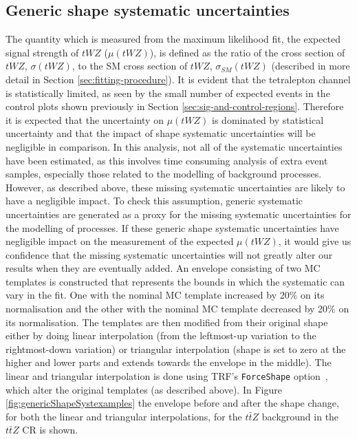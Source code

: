 \subsection{Generic shape systematic uncertainties}
\label{sec:genericShapeSyst}

The quantity which is measured from the maximum likelihood fit, the expected signal strength of $tWZ$ ($\mu (tWZ)$), is defined as the ratio of the cross section of $tWZ$, $\sigma(tWZ)$, to the SM cross section of $tWZ$, $\sigma_{SM}(tWZ)$ (described in more detail in Section \ref{sec:fitting-procedure}). It is evident that the tetralepton channel is statistically limited, as seen by the small number of expected events in the control plots shown previously in Section \ref{sec:sig-and-control-regions}. Therefore it is expected that the uncertainty on $\mu(tWZ)$ is dominated by statistical uncertainty and that the impact of shape systematic uncertainties will be negligible in comparison. In this analysis, not all of the systematic uncertainties have been estimated, as this involves time consuming analysis of extra event samples, especially those related to the modelling of background processes. However, as described above, these missing systematic uncertainties are likely to have a negligible impact. To check this assumption, generic systematic uncertainties are generated as a proxy for the missing systematic uncertainties for the modelling of processes. If these generic shape systematic uncertainties have negligible impact on the measurement of the expected $\mu (tWZ)$, it would give us confidence that the missing systematic uncertainties will not greatly alter our results when they are eventually added. An envelope consisting of two MC templates is constructed that represents the bounds in which the systematic can vary in the fit. One with the nominal MC template increased by 20$\%$ on its normalisation and the other with the nominal MC template decreased by 20$\%$ on its normalisation. The templates are then modified from their original shape either by doing linear interpolation (from the leftmost-up variation to the rightmost-down variation) or triangular interpolation (shape is set to zero at the higher and lower parts and extends towards the envelope in the middle). The linear and triangular interpolation is done using TRF's \texttt{ForceShape} option~\cite{TRF-ForceShape}, which alter the original templates (as described above). In Figure \ref{fig:genericShapeSystexamples} the envelope before and after the shape change, for both the linear and triangular interpolations, for the $t\bar{t}Z$ background in the $t\bar{t}Z$ CR is shown.

